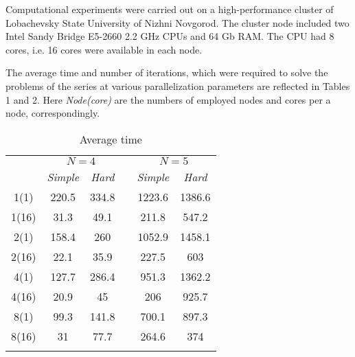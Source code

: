 \documentclass[smallextended]{svjour3}       %
\begin{document}
Computational experiments were carried out on a high-performance cluster of Lobachevsky State University of Nizhni Novgorod. The cluster node included two Intel Sandy Bridge E5-2660 2.2 GHz CPUs and 64 Gb RAM. The CPU had 8 cores, i.e. 16 cores were available in each node.

The average time and number of iterations, which were required to solve the problems of the series at various parallelization parameters are reflected in Tables 1 and 2. Here \textit{Node(core)} are the numbers of employed nodes and cores per a node, correspondingly.

\begin{table}
	\caption{Average time}
	\label{tab:1}
	\center
	\begin{tabular}{cccccc}
		\hline\noalign{\smallskip}
		\multirow{2}{*}{\textit{Node(core)}} & \multicolumn{2}{c}{ $N=4$ } & & \multicolumn{2}{c}{$N=5$} \\
		\noalign{\smallskip} \cline{2-3} \cline{5-6} \noalign{\smallskip}
		 & \textit{Simple} & \textit{Hard} & & \textit{Simple} & \textit{Hard}  \\
		\noalign{\smallskip} \hline \noalign{\smallskip}
1(1)	&	220.5	&	334.8	&	&	1223.6	&	1386.6	\\
1(16)	&	31.3	&	49.1	&	&	211.8	&	547.2	\\
2(1)	&	158.4	&	260	&	&	1052.9	&	1458.1	\\
2(16)	&	22.1	&	35.9	&	&	227.5	&	603	\\
4(1)	&	127.7	&	286.4	&	&	951.3	&	1362.2	\\
4(16)	&	20.9	&	45	&	&	206	&	925.7	\\
8(1)	&	99.3	&	141.8	&	&	700.1	&	897.3	\\
8(16)	&	31	&	77.7	&	&	264.6	&	374	\\
		\noalign{\smallskip}\hline
	\end{tabular}
\end{table}
\end{document}
